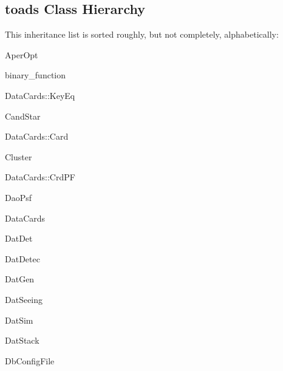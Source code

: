 \subsection{toads Class Hierarchy}
This inheritance list is sorted roughly, but not completely, alphabetically:\begin{CompactList}
\item Aper\-Opt\item binary\_\-function\begin{CompactList}
\item Data\-Cards::Key\-Eq\end{CompactList}
\item Cand\-Star\item Data\-Cards::Card\item Cluster\item {}
\item {}
\begin{CompactList}
\item {}
\end{CompactList}
\item Data\-Cards::Crd\-PF\item {}
\item Dao\-Psf\item Data\-Cards\item Dat\-Det\item Dat\-Detec\item Dat\-Gen\item Dat\-Seeing\item Dat\-Sim\item Dat\-Stack\item Db\-Config\-File\item {}
\begin{CompactList}
\item {}
\begin{CompactList}
\item {}
\item {}
\item {}

\end{CompactList}
\end{CompactList}
\end{CompactList}
